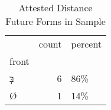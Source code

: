 \begin{table}[htbp!]
\centering
\caption{Attested Distance Future Forms in Sample}
\label{table:distfut_front}
\begin{tabular}{lrl}
\toprule
{} &  count & percent \\
front            &        &         \\
\midrule
\texthebrew{בְּ} &      6 &     86\% \\
\texthebrew{Ø}   &      1 &     14\% \\
\bottomrule
\end{tabular}
\end{table}
